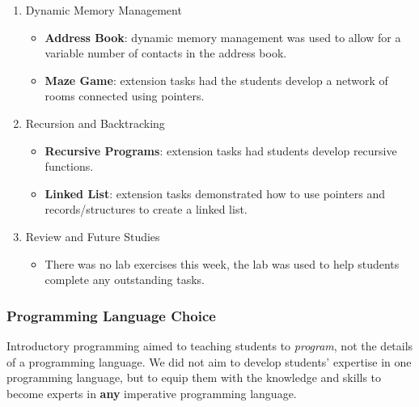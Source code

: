 \begin{enumerate}
  \item Dynamic Memory Management
  \begin{itemize}[noitemsep,nolistsep]
  	\item \textbf{Address Book}: dynamic memory management was used to allow for a variable number of contacts in the address book.
  	\item \textbf{Maze Game}: extension tasks had the students develop a network of rooms connected using pointers.
  \end{itemize}

  \item Recursion and Backtracking
  \begin{itemize}[noitemsep,nolistsep]
  	\item \textbf{Recursive Programs}: extension tasks had students develop recursive functions.
  	\item \textbf{Linked List}: extension tasks demonstrated how to use pointers and records/structures to create a linked list.
  \end{itemize}

  \item Review and Future Studies
  \begin{itemize}[noitemsep,nolistsep]
  	\item There was no lab exercises this week, the lab was used to help students complete any outstanding tasks.
  \end{itemize}
\end{enumerate}


\subsubsection{Programming Language Choice} %
\label{ssub:programming_language_choice}

Introductory programming aimed to teaching students to \emph{program}, not the details of a programming language. We did not aim to develop students' expertise in one programming language, but to equip them with the knowledge and skills to become experts in \textbf{any} imperative programming language.


